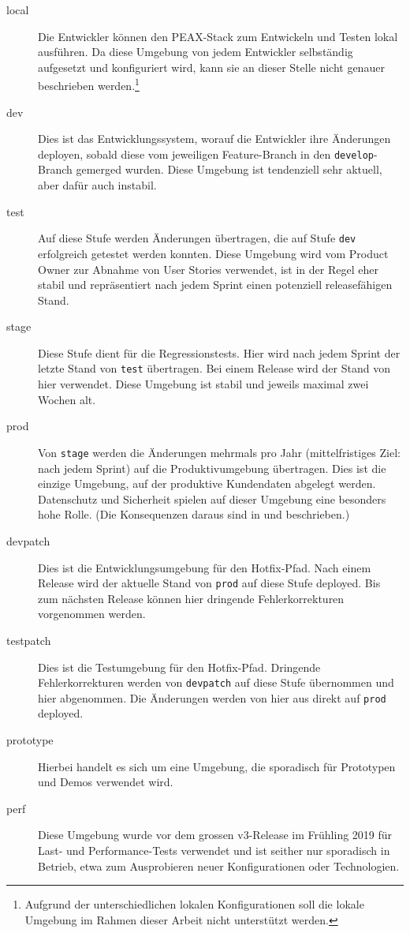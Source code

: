\begin{description}
    \item[local] Die Entwickler können den PEAX-Stack zum Entwickeln und Testen lokal ausführen. Da diese Umgebung von jedem Entwickler selbständig aufgesetzt und konfiguriert wird, kann sie an dieser Stelle nicht genauer beschrieben werden.\footnote{Aufgrund der unterschiedlichen lokalen Konfigurationen soll die lokale Umgebung im Rahmen dieser Arbeit nicht unterstützt werden.}
    \item[dev] Dies ist das Entwicklungssystem, worauf die Entwickler ihre Änderungen deployen, sobald diese vom jeweiligen Feature-Branch in den \texttt{develop}-Branch gemerged wurden. Diese Umgebung ist tendenziell sehr aktuell, aber dafür auch instabil.
    \item[test] Auf diese Stufe werden Änderungen übertragen, die auf Stufe \texttt{dev} erfolgreich getestet werden konnten. Diese Umgebung wird vom Product Owner zur Abnahme von User Stories verwendet, ist in der Regel eher stabil und repräsentiert nach jedem Sprint einen potenziell releasefähigen Stand.
    \item[stage] Diese Stufe dient für die Regressionstests. Hier wird nach jedem Sprint der letzte Stand von \texttt{test} übertragen. Bei einem Release wird der Stand von hier verwendet. Diese Umgebung ist stabil und jeweils maximal zwei Wochen alt.
    \item[prod] Von \texttt{stage} werden die Änderungen mehrmals pro Jahr (mittelfristiges Ziel: nach jedem Sprint) auf die Produktivumgebung übertragen. Dies ist die einzige Umgebung, auf der produktive Kundendaten abgelegt werden. Datenschutz und Sicherheit spielen auf dieser Umgebung eine besonders hohe Rolle. (Die Konsequenzen daraus sind in  und  beschrieben.)
    \item[devpatch] Dies ist die Entwicklungsumgebung für den Hotfix-Pfad. Nach einem Release wird der aktuelle Stand von \texttt{prod} auf diese Stufe deployed. Bis zum nächsten Release können hier dringende Fehlerkorrekturen vorgenommen werden.
    \item[testpatch] Dies ist die Testumgebung für den Hotfix-Pfad. Dringende Fehlerkorrekturen werden von \texttt{devpatch} auf diese Stufe übernommen und hier abgenommen. Die Änderungen werden von hier aus direkt auf \texttt{prod} deployed.
    \item[prototype] Hierbei handelt es sich um eine Umgebung, die sporadisch für Prototypen und Demos verwendet wird.
    \item[perf] Diese Umgebung wurde vor dem grossen v3-Release im Frühling 2019 für Last- und Performance-Tests verwendet und ist seither nur sporadisch in Betrieb, etwa zum Ausprobieren neuer Konfigurationen oder Technologien.
\end{description}

